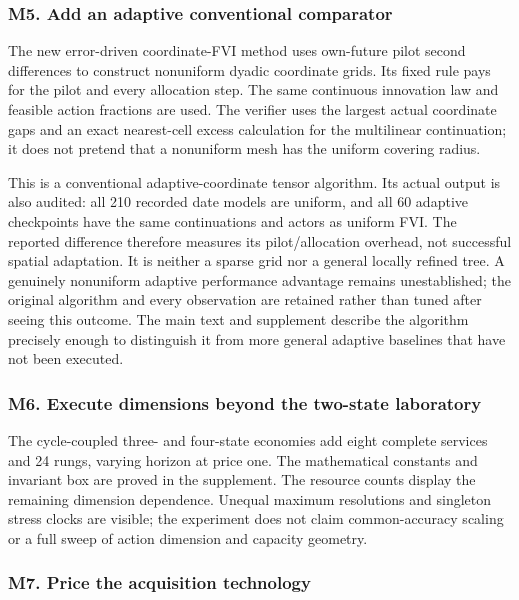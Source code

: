 \documentclass[ecta,nameyear,draft]{econsocart}
\begin{document}
\hypertarget{m5-add-an-adaptive-conventional-comparator}{%
\subsubsection{M5. Add an adaptive conventional
comparator}\label{m5-add-an-adaptive-conventional-comparator}}

The new error-driven coordinate-FVI method uses own-future pilot second
differences to construct nonuniform dyadic coordinate grids. Its fixed
rule pays for the pilot and every allocation step. The same continuous
innovation law and feasible action fractions are used. The verifier uses
the largest actual coordinate gaps and an exact nearest-cell excess
calculation for the multilinear continuation; it does not pretend that a
nonuniform mesh has the uniform covering radius.

This is a conventional adaptive-coordinate tensor algorithm. Its actual
output is also audited: all 210 recorded date models are uniform, and
all 60 adaptive checkpoints have the same continuations and actors as
uniform FVI. The reported difference therefore measures its
pilot/allocation overhead, not successful spatial adaptation. It is
neither a sparse grid nor a general locally refined tree. A genuinely
nonuniform adaptive performance advantage remains unestablished; the
original algorithm and every observation are retained rather than tuned
after seeing this outcome. The main text and supplement describe the
algorithm precisely enough to distinguish it from more general adaptive
baselines that have not been executed.

\hypertarget{m6-execute-dimensions-beyond-the-two-state-laboratory}{%
\subsubsection{M6. Execute dimensions beyond the two-state
laboratory}\label{m6-execute-dimensions-beyond-the-two-state-laboratory}}

The cycle-coupled three- and four-state economies add eight complete
services and 24 rungs, varying horizon at price one. The mathematical
constants and invariant box are proved in the supplement. The resource
counts display the remaining dimension dependence. Unequal maximum
resolutions and singleton stress clocks are visible; the experiment does
not claim common-accuracy scaling or a full sweep of action dimension
and capacity geometry.

\hypertarget{m7-price-the-acquisition-technology}{%
\subsubsection{M7. Price the acquisition
technology}\label{m7-price-the-acquisition-technology}}
\end{document}
